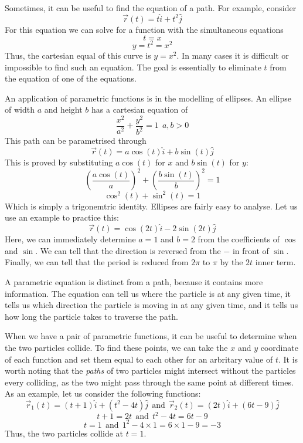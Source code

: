 \documentclass[12pt]{report}
\begin{document}
\begin{flushleft}
\bigskip
Sometimes, it can be useful to find the equation of a path. For example, 
consider
\[\vec{r}(t) = t\hat{i} + t^2\hat{j}\]
For this equation we can solve for a function with the simultaneous 
equations
\[t = x\]
\[y = t^2 = x^2\]
Thus, the cartesian equal of this curve is \(y = x^2\). In many cases it is
difficult or impossible to find such an equation. The goal is essentially
to eliminate \(t\) from the equation of one of the equations.

\bigskip
An application of parametric functions is in the modelling of ellipses. An
ellipse of width \(a\) and height \(b\) has a cartesian equation of
\[\frac{x^2}{a^2} + \frac{y^2}{b^2} = 1 \:\: a, b > 0\]
This path can be parametrised through
\[\vec{r}(t) = a\cos(t)\hat{i} + b\sin(t)\hat{j}\]
This is proved by substituting \(a\cos(t)\) for \(x\) and \(b\sin(t)\) for 
\(y\):
\[\left(\frac{a\cos(t)}{a}\right)^2 + \left(\frac{b\sin(t)}{b}\right)^2 = 1\]
\[\cos^2(t) + \sin^2(t) = 1\]
Which is simply a trigonemtric identity. Ellipses are fairly easy to analyse.
Let us use an example to practice this:
\[\vec{r}(t) = \cos(2t)\hat{i} - 2\sin(2t)\hat{j}\]
Here, we can immediately determine \(a = 1\) and \(b = 2\) from the 
coefficients of \(\cos\) and \(\sin\). We can tell that the direction is 
reversed from the \(-\) in front of \(\sin\). Finally, we can tell that the
period is reduced from \(2\pi\) to \(\pi\) by the \(2t\) inner term.

\bigskip
A parametric equation is distinct from a path, because it contains more 
information. The equation can tell us where the particle is at any given time,
it tells us which direction the particle is moving in at any given time, and it
tells us how long the particle takes to traverse the path.

\bigskip
When we have a pair of parametric functions, it can be useful to determine
when the two particles collide. To find these points, we can take the \(x\)
and \(y\) coordinate of each function and set them equal to each other for an
arbritary value of \(t\). It is worth noting that the \textit{paths} of two
particles might intersect without the particles every colliding, as the two 
might pass through the same point at different times. As an example, let us
consider the following functions:
\[\vec{r}_1(t) = (t + 1)\hat{i} + (t^2 - 4t)\hat{j} \:\:\mathrm{and}\:\:
\vec{r}_2(t) = (2t)\hat{i} + (6t - 9)\hat{j}\] 
\[t + 1 = 2t \:\:\mathrm{and}\:\: t^2 - 4t = 6t - 9\]
\[t = 1 \:\:\mathrm{and}\:\: 1^2 - 4 \times 1 = 6 \times 1 - 9 = -3\]
Thus, the two particles collide at \(t = 1\).


\end{flushleft}
\end{document}
